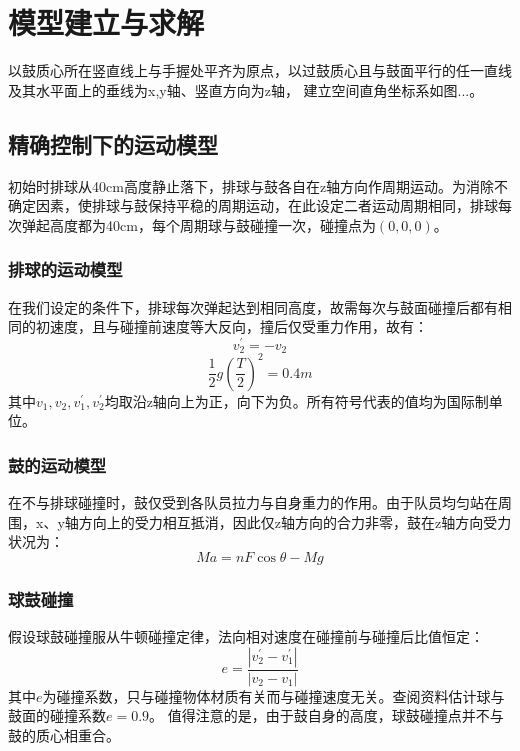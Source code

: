 \documentclass[withoutpreface,bwprint]{cumcmthesis} %
\begin{document}
\section{模型建立与求解}
以鼓质心所在竖直线上与手握处平齐为原点，以过鼓质心且与鼓面平行的任一直线及其水平面上的垂线为x,y轴、竖直方向为z轴，
建立空间直角坐标系如图...。

\subsection{精确控制下的运动模型}
初始时排球从40cm高度静止落下，排球与鼓各自在z轴方向作周期运动。为消除不确定因素，使排球与鼓保持平稳的周期运动，在此设定二者运动周期相同，排球每次弹起高度都为40cm，每个周期球与鼓碰撞一次，碰撞点为$(0,0,0)$。
\subsubsection{排球的运动模型}
在我们设定的条件下，排球每次弹起达到相同高度，故需每次与鼓面碰撞后都有相同的初速度，且与碰撞前速度等大反向，撞后仅受重力作用，故有：$$v_2^{'}=-v_2$$ $$\frac{1}{2}g(\frac{T}{2})^2=0.4m$$
其中$v_1, v_2, v_1^{'}, v_2^{'}$均取沿z轴向上为正，向下为负。所有符号代表的值均为国际制单位。
\subsubsection{鼓的运动模型}
在不与排球碰撞时，鼓仅受到各队员拉力与自身重力的作用。由于队员均匀站在周围，x、y轴方向上的受力相互抵消，因此仅z轴方向的合力非零，鼓在z轴方向受力状况为：
$$Ma=nF\cos\theta-Mg$$
\subsubsection{球鼓碰撞}
假设球鼓碰撞服从牛顿碰撞定律，法向相对速度在碰撞前与碰撞后比值恒定：
$$e=\frac{|v_2^{'}-v_1^{'}|}{|v_2-v_1|}$$
其中$e$为碰撞系数，只与碰撞物体材质有关而与碰撞速度无关。查阅资料估计球与鼓面的碰撞系数$e=0.9$。
值得注意的是，由于鼓自身的高度，球鼓碰撞点并不与鼓的质心相重合。
\end{document}
